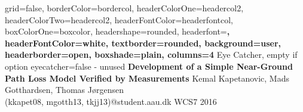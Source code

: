 \documentclass[a0paper,landscape]{baposter}
\begin{document}

\background{
}

\begin{poster}{
	grid=false,
	borderColor=bordercol,
	headerColorOne=headercol2,
	headerColorTwo=headercol2,
	headerFontColor=headerfontcol,
	boxColorOne=boxcolor,
	headershape=rounded,
	headerfont=\Large\sf\bf,
	headerFontColor=white,
	textborder=rounded,
	background=user,
	headerborder=open,
  	boxshade=plain,
  	columns=4
}
{
	Eye Catcher, empty if option eyecatcher=false - unused
}
{\sf\bf
	Development of a Simple Near-Ground Path Loss Model Verified by Measurements
}
{
	\vspace{1em} Kemal Kapetanovic, Mads Gotthardsen, Thomas Jørgensen\\
	{\smaller (kkapet08, mgotth13, tkjj13)@student.aau.dk WCS7 2016}
}
{
\setlength\fboxsep{0pt}
\setlength\fboxrule{0.5pt}
	\fbox{
		\begin{minipage}{14em}
		\end{minipage}
	}
}

\end{poster}
\end{document}
